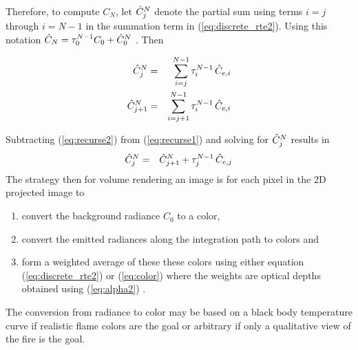 Therefore, to compute $C_N$, let $\hat{C}_{j}^N$ denote the partial sum using terms $i=j$ through $i=N-1$ in the summation term in (\ref{eq:discrete_rte2}).  Using this notation $\hat{C}_N=\tau_{0}^{N-1}C_0+\hat{C}_{0}^N$ . Then

\begin{eqnarray}
\label{eq:recurse1}
\hat{C}_{j}^N &= &\sum_{i=j}^{N-1}\tau_{i}^{N-1}\,\hat{C}_{e,i}\\
\label{eq:recurse2}
\hat{C}_{j+1}^N     &= &\sum_{i=j+1}^{N-1}  \tau_{i}^{N-1}\,\hat{C}_{e,i}
\end{eqnarray}

Subtracting (\ref{eq:recurse2}) from (\ref{eq:recurse1}) and solving for $\hat{C}_{j}^N$ results in
\begin{eqnarray}
\label{eq:color}
\hat{C}_{j}^N&=&\hat{C}_{j+1}^N+\tau_{j}^{N-1}\,\hat{C}_{e,j}
\end{eqnarray}
The strategy then for volume rendering an image is for each pixel in the 2D projected image to
\begin{enumerate}
\item convert the background radiance $C_0$ to a color,
\item convert the emitted radiances along the integration path to colors and
\item form a weighted average of these these colors using either equation (\ref{eq:discrete_rte2}) or (\ref{eq:color}) where the weights are optical depths obtained using (\ref{eq:alpha2}) .
\end{enumerate}
The conversion from radiance to color may be based on a black body temperature curve if realistic flame colors are the goal or arbitrary if only a qualitative view of the fire is the goal.
